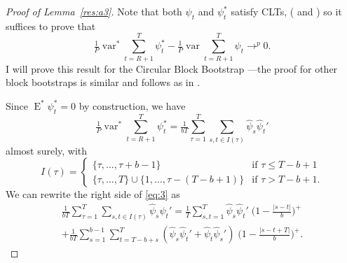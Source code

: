 \documentclass[12pt,fleqn]{article}
\theoremstyle{definition}
\DeclareMathOperator{\E}{E}
\DeclareMathOperator{\var}{var}
\newcommand{\osum}[1]{\sum_{#1=R+1}^T}
\newcommand{\clt}{CLT}
\begin{document}
\begin{proof}[Proof of Lemma~\ref{res:a3}]
  Note that both $\psi_t$ and $\psi_t^*$ satisfy
  \clt s, (\citealp[Theorem~2]{Jon:97} and
  \citealp[Theorem~1]{Cal:13}) so it suffices to prove that
  \[ \tfrac{ 1 }{ P } \var^* \osum{t} \psi_t^* 
  - \tfrac{ 1 }{ P } \var \osum{t} \psi_t \to^p
  0. \] I will prove this result for the Circular Block Bootstrap
  \citep{PoR:92}---the proof for other block bootstraps is similar and
  follows as in \cite{Cal:13}.

  \newcommand{\su}{\tfrac{ 1 }{ b T } \sum_{ \tau = 1 }^{ T }%
  \sum_{ s, t \in I( \tau ) }}

  Since $\E^* \psi_t^* = 0$ by construction, we have
  \begin{equation}\label{eq:3}
  \tfrac{ 1 }{ P } \var^* \sum_{ t = R + 1 }^T \psi_t^*
  = \su \hat \psi_s \hat \psi_t'
  \end{equation}
  almost surely, with
  \begin{equation*}
    I(\tau) =
    \begin{cases}
      \{ \tau, \dots, \tau + b - 1 \} & \text{if } \tau \leq T - b + 1 \\
      \{ \tau, \dots, T \} \cup \{ 1, \dots, \tau - ( T - b + 1 ) \}
      & \text{if } \tau > T - b + 1.
    \end{cases}
  \end{equation*}
  We can rewrite the right side of \eqref{eq:3} as
  \begin{multline}\label{eq:6}
    \su \hat\psi_s \hat\psi_t'
    = \tfrac{1}{T} \sum_{s,t=1}^T \hat\psi_s \hat\psi_t' \;
      \big(1 - \tfrac{\lvert s - t \rvert}{b}\big)^+ \\
      + \tfrac{1}{bT} \sum_{s = 1}^{b - 1} \sum_{t = T - b + s}^{T}
        (\hat\psi_s \hat\psi_t' +
         \hat\psi_t \hat\psi_s') \;
        \big(1 - \tfrac{\lvert s - t + T\rvert}{b}\big)^+.
  \end{multline}


\end{proof}
\end{document}
